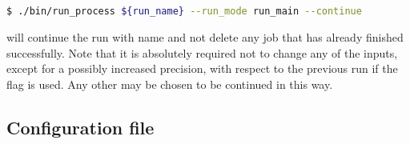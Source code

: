 \documentclass[english,11pt]{article}
\begin{document}
\begin{enumerate}[label={\arabic*.)}]
\lstset{basicstyle=\small, frame=none}
{\tt
\begin{lstlisting}[language=bash]
 $ ./bin/run_process ${run_name} --run_mode run_main --continue
\end{lstlisting}
}%
will continue the run with name  and not delete any job that has already finished successfully. Note that it is absolutely required not to change any of the inputs, except for a possibly increased precision, with respect to the previous run if the flag  is used. Any other  may be chosen to be continued in this way.
\end{enumerate}

\subsection{Configuration file}\label{sec:config}
\end{document}
